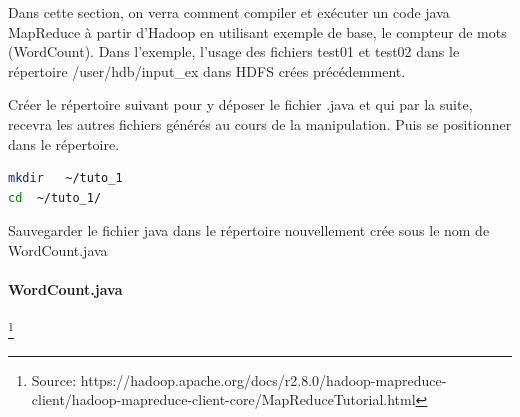 \documentclass[12pt,english]{book}
\begin{document}
Dans cette section, on verra comment compiler et exécuter un code java MapReduce à partir d’Hadoop en utilisant exemple de base, le compteur de mots (WordCount).   Dans l’exemple, l’usage des fichiers test01 et test02 dans le répertoire /user/hdb/input\_ex dans HDFS crées précédemment.  

Créer le répertoire suivant pour y déposer le fichier .java et qui par la suite, recevra les autres fichiers générés au cours de la manipulation. Puis se positionner dans le répertoire.

\begin{lstlisting}[language=bash, frame=single]
mkdir   ~/tuto_1
cd  ~/tuto_1/
\end{lstlisting}

Sauvegarder le fichier java dans le répertoire nouvellement crée sous le nom de WordCount.java


\paragraph{WordCount.java} \footnote{Source: https://hadoop.apache.org/docs/r2.8.0/hadoop-mapreduce-client/hadoop-mapreduce-client-core/MapReduceTutorial.html}
\end{document}
